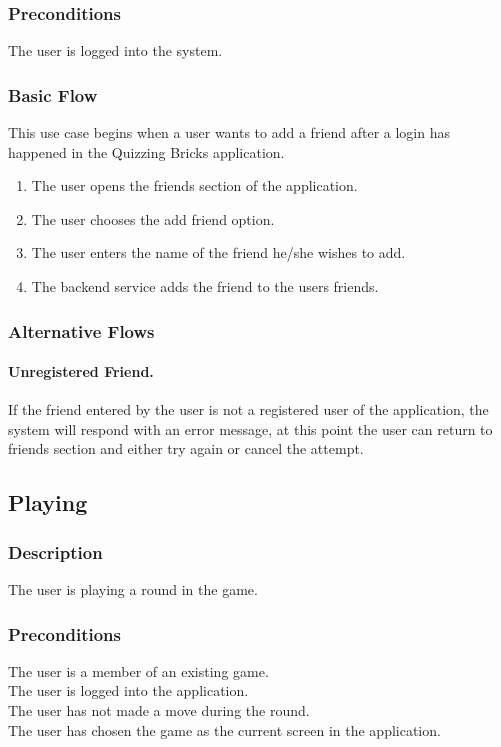 \subsubsection{Preconditions}
The user is logged into the system.

\subsubsection{Basic Flow}
This use case begins  when a user wants to add a friend after a login has happened in the Quizzing Bricks application.
\begin{enumerate}
	\item The user opens the friends section of the application.
	\item The user chooses the add friend option.
	\item The user enters the name of the friend he/she wishes to add.
	\item The backend service adds the friend to the users friends.
\end{enumerate}

\subsubsection{Alternative Flows}
\paragraph{Unregistered Friend.}
If the friend entered by the user is not a registered user of the application, the system will respond with an error message, at this point the user can return to friends section and either try again or cancel the attempt.


\subsection{Playing}
\subsubsection{Description}
The user is playing a round in the game.

\subsubsection{Preconditions}
The user is a member of an existing game.\\
The user is logged into the application.\\
The user has not made a move during the round.\\
The user has chosen the game as the current screen in the application.

